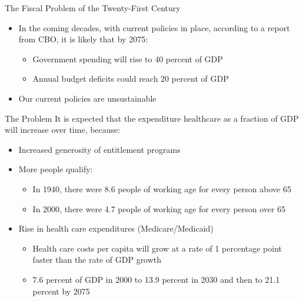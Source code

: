 \documentclass[aspectratio=1610]{beamer}
\begin{document}
\begin{frame}[wide]{The Fiscal Problem of the Twenty-First Century}
	\begin{itemize}
		\item In the coming decades, with current policies in place, according to a report from CBO, it is likely that by 2075:
		\vspace{4mm}
		\begin{itemize}
			\item Government spending will rise to 40 percent of GDP 
			\vspace{2mm}
			\item Annual budget deficits could reach 20 percent of GDP 
		\end{itemize}
		\vspace{5mm}
		\item Our current policies are unsustainable
	\end{itemize}
\end{frame}

\begin{frame}[wide]{The Problem}
	It is expected that the expenditure healthcare as a fraction of GDP will increase over time, because:
	\vspace{3mm}
	\begin{itemize}
		\item Increased generosity of entitlement programs
		\vspace{4mm}
		\item More people qualify:
		\vspace{2mm}
		\begin{itemize}
			\item In 1940, there were 8.6 people of working age for every person above 65
			\item In 2000, there were 4.7 people of working age for every person over 65
		\end{itemize}
		\vspace{4mm}
		\item Rise in health care expenditures (Medicare/Medicaid)
		\vspace{2mm}
		\begin{itemize}
			\item Health care costs per capita will grow at a rate of 1 percentage point faster than the rate of GDP growth
			\item 7.6 percent of GDP in 2000 to 13.9 percent in 2030 and 
			then to 21.1 percent by 2075
		\end{itemize}
	\end{itemize}
\end{frame}
\end{document}
